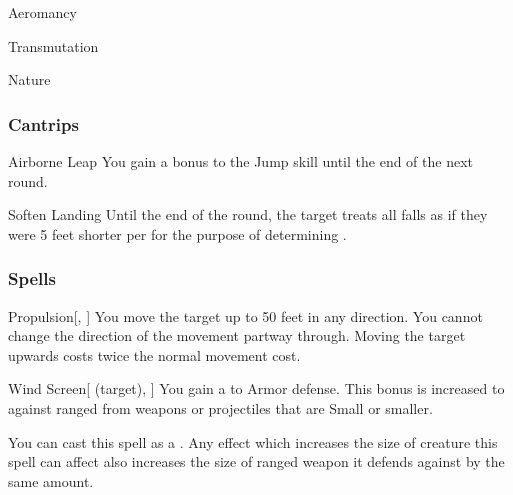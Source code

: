 
\begin{spellsection}{Aeromancy}

\begin{spellheader}
\end{spellheader}


 Transmutation

 Nature

\subsubsection{Cantrips}


\begin{freeability}{Airborne Leap}
You gain a  bonus to the Jump skill until the end of the next round.
\end{freeability}


\begin{freeability}{Soften Landing}
Until the end of the round, the target treats all falls as if they were 5 feet shorter per  for the purpose of determining .
\end{freeability}

\end{spellsection}


\subsubsection{Spells}


\lowercase{\hypertarget{spell:Propulsion}{}}\label{spell:Propulsion}
\begin{freeability}[Rank 1]{\hypertarget{spell:Propulsion}{Propulsion}}[, ]
You move the target up to 50 feet in any direction.
You cannot change the direction of the movement partway through.
Moving the target upwards costs twice the normal movement cost.
\end{freeability}
\vspace{0.25em}



\lowercase{\hypertarget{spell:Wind Screen}{}}\label{spell:Wind Screen}
\begin{attuneability}[Rank 1]{\hypertarget{spell:Wind Screen}{Wind Screen}}[ (target), ]
You gain a   to Armor defense.
This bonus is increased to  against ranged  from weapons or projectiles that are Small or smaller.

You can cast this spell as a .
Any effect which increases the size of creature this spell can affect also increases the size of ranged weapon it defends against by the same amount.
\end{attuneability}
\vspace{0.25em}



